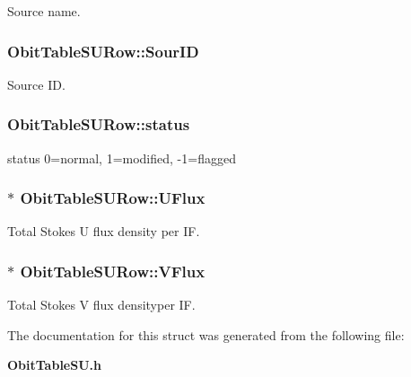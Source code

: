 Source name. 

\subsubsection{ {\bf Obit\-Table\-SURow::Sour\-ID}}\label{structObitTableSURow_o6}


Source ID. 

\subsubsection{ {\bf Obit\-Table\-SURow::status}}\label{structObitTableSURow_o25}


status 0=normal, 1=modified, -1=flagged 

\subsubsection{$\ast$ {\bf Obit\-Table\-SURow::UFlux}}\label{structObitTableSURow_o20}


Total Stokes U flux density per IF. 

\subsubsection{$\ast$ {\bf Obit\-Table\-SURow::VFlux}}\label{structObitTableSURow_o21}


Total Stokes V flux densityper IF. 



The documentation for this struct was generated from the following file:\begin{CompactItemize}
\item 
{\bf Obit\-Table\-SU.h}\end{CompactItemize}
